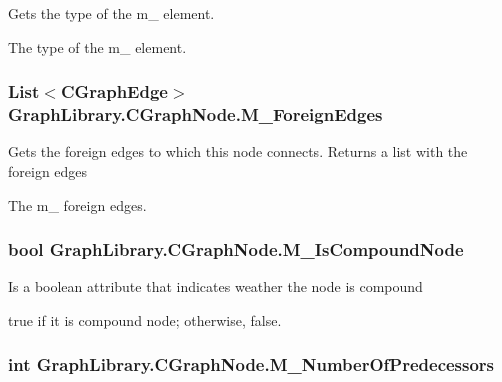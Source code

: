 Gets the type of the m\+\_\+ element. 

The type of the m\+\_\+ element. \hypertarget{class_graph_library_1_1_c_graph_node_af1dd68175bb884b10c5972c57b3c243f}{}
\subsubsection[{M\+\_\+\+Foreign\+Edges}]{\setlength{\rightskip}{0pt plus 5cm}List$<${\bf C\+Graph\+Edge}$>$ Graph\+Library.\+C\+Graph\+Node.\+M\+\_\+\+Foreign\+Edges\hspace{0.3cm}{\ttfamily [get]}}\label{class_graph_library_1_1_c_graph_node_af1dd68175bb884b10c5972c57b3c243f}


Gets the foreign edges to which this node connects. Returns a list with the foreign edges 

The m\+\_\+ foreign edges. \hypertarget{class_graph_library_1_1_c_graph_node_a8b1a7e4ee0887d7555ed8e7fc183cf21}{}
\subsubsection[{M\+\_\+\+Is\+Compound\+Node}]{\setlength{\rightskip}{0pt plus 5cm}bool Graph\+Library.\+C\+Graph\+Node.\+M\+\_\+\+Is\+Compound\+Node\hspace{0.3cm}{\ttfamily [get]}}\label{class_graph_library_1_1_c_graph_node_a8b1a7e4ee0887d7555ed8e7fc183cf21}


Is a boolean attribute that indicates weather the node is compound 

{\ttfamily true} if it is compound node; otherwise, {\ttfamily false}. \hypertarget{class_graph_library_1_1_c_graph_node_ac0f1e583a6b672b03e146cb730b1682a}{}
\subsubsection[{M\+\_\+\+Number\+Of\+Predecessors}]{\setlength{\rightskip}{0pt plus 5cm}int Graph\+Library.\+C\+Graph\+Node.\+M\+\_\+\+Number\+Of\+Predecessors\hspace{0.3cm}{\ttfamily [get]}}\label{class_graph_library_1_1_c_graph_node_ac0f1e583a6b672b03e146cb730b1682a}


